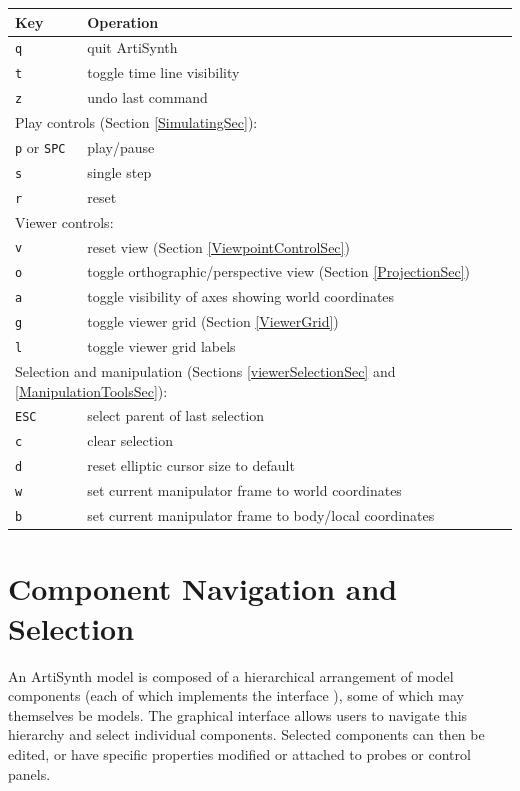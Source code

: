 \documentclass{article}
\begin{document}
\begin{center}
\begin{tabular}{|l|l|}
\hline
Key & Operation \\
\hline
{\tt q} & quit ArtiSynth \\
{\tt t} & toggle time line visibility \\
{\tt z} & undo last command \\
\hline
\multicolumn{2}{|l|}{Play controls (Section \ref{SimulatingSec}):}\\
\hline
{\tt p} or {\tt SPC} & play/pause\\
{\tt s} & single step \\
{\tt r} & reset \\
\hline
\multicolumn{2}{|l|}{Viewer controls:}\\
\hline
{\tt v} & reset view (Section \ref{ViewpointControlSec})\\
{\tt o} & toggle orthographic/perspective view 
(Section \ref{ProjectionSec})  \\
{\tt a} & toggle visibility of axes showing world coordinates\\
{\tt g} & toggle viewer grid (Section \ref{ViewerGrid})\\
{\tt l} & toggle viewer grid labels\\
\hline
\multicolumn{2}{|l|}{%
Selection and manipulation (Sections \ref{viewerSelectionSec} 
and \ref{ManipulationToolsSec}):}\\
\hline
{\tt ESC} & select parent of last selection\\
{\tt c} & clear selection\\
{\tt d} & reset elliptic cursor size to default\\
{\tt w} & set current manipulator frame to world coordinates\\
{\tt b} & set current manipulator frame to body/local coordinates\\
\hline
\end{tabular}
\end{center}

\section{Component Navigation and Selection}

An ArtiSynth model is composed of a hierarchical arrangement of
model components (each of which implements the interface 
), 
some of which may themselves
be models. The graphical interface allows users to navigate this
hierarchy and select individual components. Selected components
can then be edited, or have specific properties modified or attached
to probes or control panels.
\end{document}
